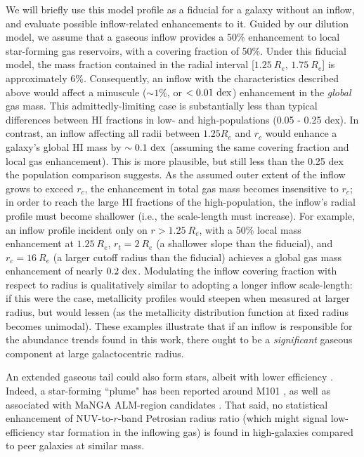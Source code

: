 We will briefly use this model profile as a fiducial for a galaxy without an inflow, and evaluate possible inflow-related enhancements to it. Guided by our dilution model, we assume that a gaseous inflow provides a 50\% enhancement to local star-forming gas reservoirs, with a covering fraction of 50\%. Under this fiducial model, the mass fraction contained in the radial interval [$1.25 ~ R_e$, $1.75 ~ R_e$] is approximately 6\%. Consequently, an inflow with the characteristics described above would affect a minuscule ($\sim 1\%$, or $< 0.01 ~ {\rm dex}$) enhancement in the \emph{global} gas mass. This admittedly-limiting case is substantially less than typical differences between HI fractions in low- and high-\metdisp populations (0.05 - 0.25 dex). In contrast, an inflow affecting all radii between $1.25 R_e$ and $r_c$ would enhance a galaxy's global HI mass by $\sim 0.1 ~ {\rm dex}$ (assuming the same covering fraction and local gas enhancement). This is more plausible, but still less than the 0.25 dex the population comparison suggests. As the assumed outer extent of the inflow grows to exceed $r_c$, the enhancement in total gas mass becomes insensitive to $r_c$; in order to reach the large HI fractions of the high-\metdisp population, the inflow's radial profile must become shallower (i.e., the scale-length must increase). For example, an inflow profile incident only on $r > 1.25 ~ R_e$, with a 50\% local mass enhancement at $1.25 ~ R_e$, $r_t = 2 ~ R_e$ (a shallower slope than the fiducial), and $r_c = 16 ~ R_e$ (a larger cutoff radius than the fiducial) achieves a global gas mass enhancement of nearly $0.2 ~ {\rm dex}$. Modulating the inflow covering fraction with respect to radius is qualitatively similar to adopting a longer inflow scale-length: if this were the case, metallicity profiles would steepen when measured at larger radius, but \metdisp would lessen (as the metallicity distribution function at fixed radius becomes unimodal). These examples illustrate that if an inflow is responsible for the abundance trends found in this work, there ought to be a \emph{significant} gaseous component at large galactocentric radius.

An extended gaseous tail could also form stars, albeit with lower efficiency \citep{rafelski_2016}. Indeed, a star-forming ``plume" has been reported around M101 \citep{mihos_2013_m101-uvdisk}, as well as associated with MaNGA ALM-region candidates \citep{hwang_2019_manga_almrs}. That said, no statistical enhancement of NUV-to-$r$-band Petrosian radius ratio (which might signal low-efficiency star formation in the inflowing gas) is found in high-\metdisp galaxies compared to peer galaxies at similar mass.

